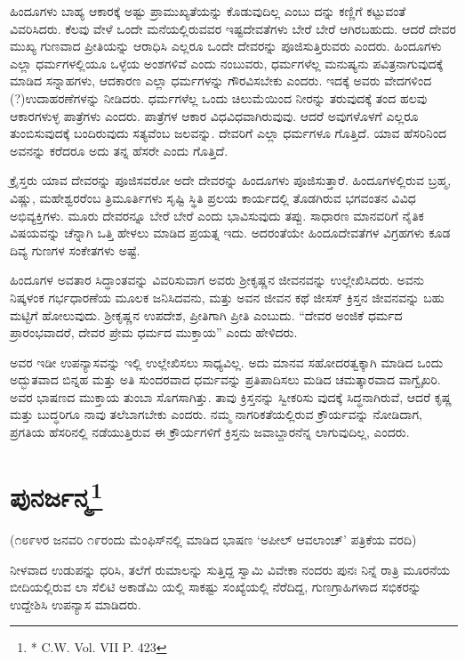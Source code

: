 ಹಿಂದೂಗಳು ಬಾಹ್ಯ ಆಕಾರಕ್ಕೆ ಅಷ್ಟು ಪ್ರಾಮುಖ್ಯತೆಯನ್ನು ಕೊಡುವುದಿಲ್ಲ ಎಂಬು ದನ್ನು ಕಣ್ಣಿಗೆ ಕಟ್ಟುವಂತೆ ವಿವರಿಸಿದರು. ಕೆಲವು ವೇಳೆ ಒಂದೇ ಮನೆಯಲ್ಲಿರುವವರ ಇಷ್ಟದೇವತೆಗಳು ಬೇರೆ ಬೇರೆ ಆಗಿರಬಹುದು. ಆದರೆ ದೇವರ ಮುಖ್ಯ ಗುಣವಾದ ಪ್ರೀತಿಯನ್ನು ಆರಾಧಿಸಿ ಎಲ್ಲರೂ ಒಂದೇ ದೇವರನ್ನು ಪೂಜಿಸುತ್ತಿರುವರು ಎಂದರು. ಹಿಂದೂಗಳು ಎಲ್ಲಾ ಧರ್ಮಗಳಲ್ಲಿಯೂ ಒಳ್ಳೆಯ ಅಂಶಗಳಿವೆ ಎಂದು ನಂಬುವರು, ಧರ್ಮಗಳೆಲ್ಲ ಮನುಷ್ಯನು ಪವಿತ್ರನಾಗುವುದಕ್ಕೆ ಮಾಡಿದ ಸನ್ನಾಹಗಳು, ಆದಕಾರಣ ಎಲ್ಲಾ ಧರ್ಮಗಳನ್ನು ಗೌರವಿಸಬೇಕು ಎಂದರು. ಇದಕ್ಕೆ ಅವರು ವೇದಗಳಿಂದ (?)ಉದಾಹರಣೆಗಳನ್ನು ನೀಡಿದರು. ಧರ್ಮಗಳೆಲ್ಲ ಒಂದು ಚಿಲುಮೆಯಿಂದ ನೀರನ್ನು ತರುವುದಕ್ಕೆ ತಂದ ಹಲವು ಆಕಾರಗಳುಳ್ಳ ಪಾತ್ರೆಗಳು ಎಂದರು. ಪಾತ್ರೆಗಳ ಆಕಾರ ವಿಧವಿಧವಾಗಿರುವುವು. ಆದರೆ ಅವುಗಳೊಳಗೆ ಎಲ್ಲರೂ ತುಂಬಿಸುವುದಕ್ಕೆ ಬಂದಿರುವುದು ಸತ್ಯವೆಂಬ ಜಲವನ್ನು. ದೇವರಿಗೆ ಎಲ್ಲಾ ಧರ್ಮಗಳೂ ಗೊತ್ತಿದೆ. ಯಾವ ಹೆಸರಿನಿಂದ ಅವನನ್ನು ಕರೆದರೂ ಅದು ತನ್ನ ಹೆಸರೇ ಎಂದು ಗೊತ್ತಿದೆ.

ಕ್ರೈಸ್ತರು ಯಾವ ದೇವರನ್ನು ಪೂಜಿಸವರೋ ಅದೇ ದೇವರನ್ನು ಹಿಂದೂಗಳು ಪೂಜಿಸುತ್ತಾರೆ. ಹಿಂದೂಗಳಲ್ಲಿರುವ ಬ್ರಹ್ಮ, ವಿಷ್ಣು, ಮಹೇಶ್ವರರೆಂಬ ತ್ರಿಮೂರ್ತಿಗಳು ಸೃಷ್ಟಿ ಸ್ಥಿತಿ ಪ್ರಲಯ ಕಾರ್ಯದಲ್ಲಿ ತೊಡಗಿರುವ ಭಗವಂತನ ವಿವಿಧ ಅಭಿವ್ಯಕ್ತಿಗಳು. ಮೂರು ದೇವರನ್ನೂ ಬೇರೆ ಬೇರೆ ಎಂದು ಭಾವಿಸುವುದು ತಪ್ಪು. ಸಾಧಾರಣ ಮಾನವರಿಗೆ ನೈತಿಕ ವಿಷಯವನ್ನು ಚೆನ್ನಾಗಿ ಒತ್ತಿ ಹೇಳಲು ಮಾಡಿದ ಪ್ರಯತ್ನ ಇದು. ಅದರಂತೆಯೇ ಹಿಂದೂದೇವತೆಗಳ ವಿಗ್ರಹಗಳು ಕೂಡ ದಿವ್ಯ ಗುಣಗಳ ಸಂಕೇತಗಳು ಅಷ್ಟೆ.

ಹಿಂದೂಗಳ ಅವತಾರ ಸಿದ್ಧಾಂತವನ್ನು ವಿವರಿಸುವಾಗ ಅವರು ಶ‍್ರೀಕೃಷ್ಣನ ಜೀವನವನ್ನು ಉಲ್ಲೇಖಿಸಿದರು. ಅವನು ನಿಷ್ಕಳಂಕ ಗರ್ಭಧಾರಣೆಯ ಮೂಲಕ ಜನಿಸಿದವನು, ಮತ್ತು ಅವನ ಜೀವನ ಕಥೆ ಜೀಸಸ್​ ಕ್ರಿಸ್ತನ ಜೀವನವನ್ನು ಬಹು ಮಟ್ಟಿಗೆ ಹೋಲುವುದು. ಶ‍್ರೀಕೃಷ್ಣನ ಉಪದೇಶ, ಪ್ರೀತಿಗಾಗಿ ಪ್ರೀತಿ ಎಂಬುದು. “ದೇವರ ಅಂಜಿಕೆ ಧರ್ಮದ ಪ್ರಾರಂಭವಾದರೆ, ದೇವರ ಪ್ರೇಮ ಧರ್ಮದ ಮುಕ್ತಾಯ” ಎಂದು ಹೇಳಿದರು.

ಅವರ ಇಡೀ ಉಪನ್ಯಾಸವನ್ನು ಇಲ್ಲಿ ಉಲ್ಲೇಖಿಸಲು ಸಾಧ್ಯವಿಲ್ಲ. ಅದು ಮಾನವ ಸಹೋದರತ್ವಕ್ಕಾಗಿ ಮಾಡಿದ ಒಂದು ಅದ್ಭುತವಾದ ಬಿನ್ನಹ ಮತ್ತು ಅತಿ ಸುಂದರವಾದ ಧರ್ಮವನ್ನು ಪ್ರತಿಪಾದಿಸಲು ಮಡಿದ ಚಮತ್ಕಾರವಾದ ವಾಗ್ವೈಖರಿ. ಅವರ ಭಾಷಣದ ಮುಕ್ತಾಯ ತುಂಬಾ ಸೊಗಸಾಗಿತ್ತು. ತಾವು ಕ್ರಿಸ್ತನನ್ನು ಸ್ವೀಕರಿಸು ವುದಕ್ಕೆ ಸಿದ್ಧನಾಗಿರುವೆ, ಆದರೆ ಕೃಷ್ಣ ಮತ್ತು ಬುದ್ಧರಿಗೂ ನಾವು ತಲೆಬಾಗಬೇಕು ಎಂದರು. ನಮ್ಮ ನಾಗರಿಕತೆಯಲ್ಲಿರುವ ಕ್ರೌರ್ಯವನ್ನು ನೋಡಿದಾಗ, ಪ್ರಗತಿಯ ಹೆಸರಿನಲ್ಲಿ ನಡೆಯುತ್ತಿರುವ ಈ ಕ್ರೌರ್ಯಗಳಿಗೆ ಕ್ರಿಸ್ತನು ಜವಾಬ್ದಾರನೆನ್ನ ಲಾಗುವುದಿಲ್ಲ, ಎಂದರು.


\section[ಪುನರ್ಜನ್ಮ]{ಪುನರ್ಜನ್ಮ\protect\footnote{* C.W. Vol. VII P. 423}}

\begin{center}
(೧೮೯೪ರ ಜನವರಿ ೧೯ರಂದು ಮೆಂಫಿಸ್​ನಲ್ಲಿ ಮಾಡಿದ ಭಾಷಣ ‘ಅಪೀಲ್​ ಆವಲಾಂಚ್​’ ಪತ್ರಿಕೆಯ ವರದಿ)
\end{center}

ನೀಳವಾದ ಉಡುಪನ್ನು ಧರಿಸಿ, ತಲೆಗೆ ರುಮಾಲನ್ನು ಸುತ್ತಿದ್ದ ಸ್ವಾಮಿ ವಿವೇಕಾ ನಂದರು ಪುನಃ ನಿನ್ನೆ ರಾತ್ರಿ ಮೂರನೆಯ ಬೀದಿಯಲ್ಲಿರುವ ಲಾ ಸೆಲಿಟಿ ಅಕಾಡೆಮಿ ಯಲ್ಲಿ ಸಾಕಷ್ಟು ಸಂಖ್ಯೆಯಲ್ಲಿ ನೆರೆದಿದ್ದ, ಗುಣಗ್ರಾಹಿಗಳಾದ ಸಭಿಕರನ್ನು ಉದ್ದೇಶಿಸಿ ಉಪನ್ಯಾಸ ಮಾಡಿದರು.

